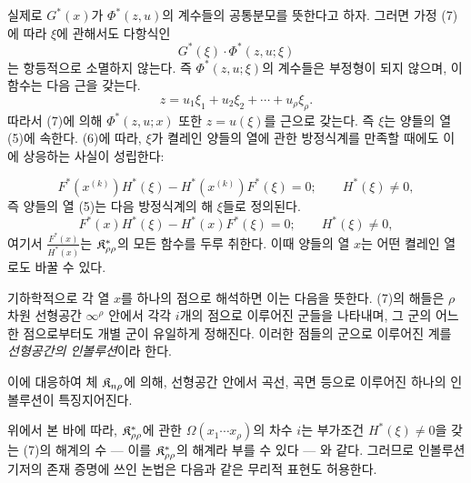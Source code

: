 실제로 $G^*(x)$가 $\Phi^*(z,u)$의 계수들의 공통분모를 뜻한다고 하자. 그러면 가정 (7)에 따라 $\xi$에 관해서도 다항식인
\[
G^*(\xi)\cdot\Phi^*(z,u;\xi)
\]
는 항등적으로 소멸하지 않는다. 즉 $\Phi^*(z,u;\xi)$의 계수들은 부정형이 되지 않으며, 이 함수는 다음 근을 갖는다.
\[
z=u_1\xi_1+u_2\xi_2+\cdots+u_\rho\xi_\rho.
\]
따라서 (7)에 의해 $\Phi^*(z,u;x)$ 또한 $z=u(\xi)$를 근으로 갖는다. 즉 $\xi$는 양들의 열 (5)에 속한다. (6)에 따라, $\xi$가 켤레인 양들의 열에 관한 방정식계를 만족할 때에도 이에 상응하는 사실이 성립한다:

\[
F^*(x^{(k)})H^*(\xi)-H^*(x^{(k)})F^*(\xi)=0;\qquad H^*(\xi)\ne0,
\]
즉 양들의 열 (5)는 다음 방정식계의 해 $\xi$들로 정의된다.
\[
F^*(x)H^*(\xi)-H^*(x)F^*(\xi)=0;\qquad H^*(\xi)\ne0,
\]
여기서 $\frac{F^*(x)}{H^*(x)}$는 $\mathfrak K^*_{\rho\rho}$의 모든 함수를 두루 취한다. 이때 양들의 열 $x$는 어떤 켤레인 열로도 바꿀 수 있다.

기하학적으로 각 열 $x$를 하나의 점으로 해석하면 이는 다음을 뜻한다. (7)의 해들은 $\rho$차원 선형공간 $\infty^\rho$ 안에서 각각 $i$개의 점으로 이루어진 군들을 나타내며, 그 군의 어느 한 점으로부터도 개별 군이 유일하게 정해진다. 이러한 점들의 군으로 이루어진 계를 \glqq{}\emph{선형공간의 인볼루션}\grqq{}이라 한다.

이에 대응하여 체 $\mathfrak K_{n\rho}$에 의해, 선형공간 안에서 곡선, 곡면 등으로 이루어진 하나의 인볼루션이 특징지어진다.

위에서 본 바에 따라, $\mathfrak K^*_{\rho\rho}$에 관한 $\Omega(x_1\cdots x_\rho)$의 차수 $i$는 부가조건 $H^*(\xi)\ne0$을 갖는 (7)의 해계의 수 --- 이를 $\mathfrak K^*_{\rho\rho}$의 해계라 부를 수 있다 --- 와 같다. 그러므로 인볼루션기저의 존재 증명에 쓰인 논법은 다음과 같은 무리적 표현도 허용한다.

